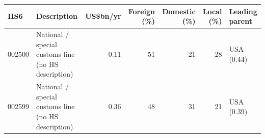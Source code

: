\begin{tabular}{@{}l p{6.4cm} r r r r l@{}}
\toprule
HS6 & Description & US\$bn/yr & Foreign (\%) & Domestic (\%) & Local (\%) & Leading parent \\
\midrule
002500 & National /\allowbreak{} special customs line (no HS description) & 0.11 & 51 & 21 & 28 & USA (0.44) \\
002599 & National /\allowbreak{} special customs line (no HS description) & 0.36 & 48 & 31 & 21 & USA (0.39) \\
\bottomrule
\end{tabular}
